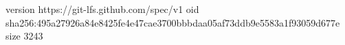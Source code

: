 version https://git-lfs.github.com/spec/v1
oid sha256:495a27926a84e8425fe4e47cae3700bbbdaa05af73ddb9e5583a1f93059d677e
size 3243
